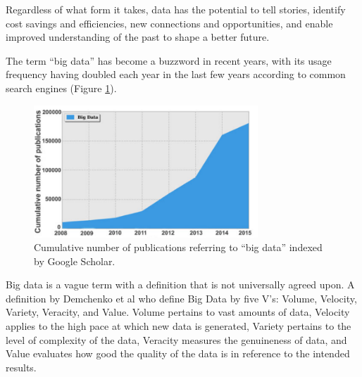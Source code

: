 Regardless of what form it takes, data has the potential to tell stories, identify cost savings and efficiencies, new connections and opportunities, and enable improved understanding of the past to shape a better future\cite{Zillner2016}.

The term “big data” has become a buzzword in recent years, with its usage frequency having doubled each year in the last few years according to common search engines (Figure \ref{fig:bigDataGoogleScholar}).

\begin{figure}[h!]
    \center
    \includegraphics[width=0.75\textwidth]{images/chapter1/publication_big_data.PNG}
    \caption{Cumulative number of publications referring to “big data” indexed by Google Scholar.}
    \label{fig:bigDataGoogleScholar}
  \end{figure}
 
Big data is a vague term with a definition that is not universally agreed upon. A definition by Demchenko et al\cite{demchenko2012addressing} who define Big Data by five V’s: Volume, Velocity, Variety, Veracity, and Value. Volume pertains to vast amounts of data, Velocity applies to the high pace at which new data is generated, Variety pertains to the level of complexity of the data, Veracity measures the genuineness of data, and Value evaluates how good the quality of the data is in reference to the intended results.


